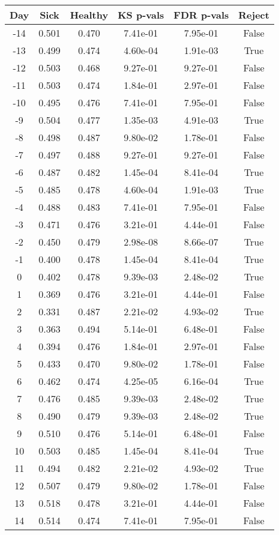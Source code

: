 \begin{tabular}{c|c|c|c|c|c}
Day &  Sick & Healthy &  KS p-vals & FDR p-vals & Reject\\
\hline
-14 & 0.501 &   0.470 &   7.41e-01 &   7.95e-01 &  False\\
-13 & 0.499 &   0.474 &   4.60e-04 &   1.91e-03 &   True\\
-12 & 0.503 &   0.468 &   9.27e-01 &   9.27e-01 &  False\\
-11 & 0.503 &   0.474 &   1.84e-01 &   2.97e-01 &  False\\
-10 & 0.495 &   0.476 &   7.41e-01 &   7.95e-01 &  False\\
 -9 & 0.504 &   0.477 &   1.35e-03 &   4.91e-03 &   True\\
 -8 & 0.498 &   0.487 &   9.80e-02 &   1.78e-01 &  False\\
 -7 & 0.497 &   0.488 &   9.27e-01 &   9.27e-01 &  False\\
 -6 & 0.487 &   0.482 &   1.45e-04 &   8.41e-04 &   True\\
 -5 & 0.485 &   0.478 &   4.60e-04 &   1.91e-03 &   True\\
 -4 & 0.488 &   0.483 &   7.41e-01 &   7.95e-01 &  False\\
 -3 & 0.471 &   0.476 &   3.21e-01 &   4.44e-01 &  False\\
 -2 & 0.450 &   0.479 &   2.98e-08 &   8.66e-07 &   True\\
 -1 & 0.400 &   0.478 &   1.45e-04 &   8.41e-04 &   True\\
  0 & 0.402 &   0.478 &   9.39e-03 &   2.48e-02 &   True\\
  1 & 0.369 &   0.476 &   3.21e-01 &   4.44e-01 &  False\\
  2 & 0.331 &   0.487 &   2.21e-02 &   4.93e-02 &   True\\
  3 & 0.363 &   0.494 &   5.14e-01 &   6.48e-01 &  False\\
  4 & 0.394 &   0.476 &   1.84e-01 &   2.97e-01 &  False\\
  5 & 0.433 &   0.470 &   9.80e-02 &   1.78e-01 &  False\\
  6 & 0.462 &   0.474 &   4.25e-05 &   6.16e-04 &   True\\
  7 & 0.476 &   0.485 &   9.39e-03 &   2.48e-02 &   True\\
  8 & 0.490 &   0.479 &   9.39e-03 &   2.48e-02 &   True\\
  9 & 0.510 &   0.476 &   5.14e-01 &   6.48e-01 &  False\\
 10 & 0.503 &   0.485 &   1.45e-04 &   8.41e-04 &   True\\
 11 & 0.494 &   0.482 &   2.21e-02 &   4.93e-02 &   True\\
 12 & 0.507 &   0.479 &   9.80e-02 &   1.78e-01 &  False\\
 13 & 0.518 &   0.478 &   3.21e-01 &   4.44e-01 &  False\\
 14 & 0.514 &   0.474 &   7.41e-01 &   7.95e-01 &  False\\
\end{tabular}